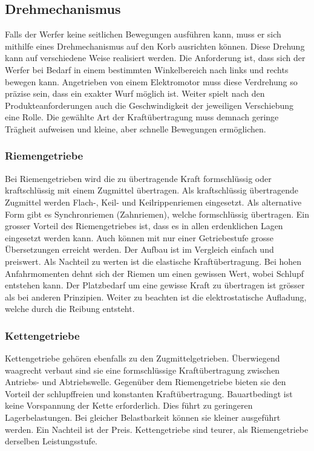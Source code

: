 \subsection{Drehmechanismus}
Falls der Werfer keine seitlichen Bewegungen ausführen kann, muss er sich mithilfe eines Drehmechanismus auf den Korb ausrichten können. Diese Drehung kann auf verschiedene Weise realisiert werden. Die Anforderung ist, dass sich der Werfer bei Bedarf in einem bestimmten Winkelbereich nach links und rechts bewegen kann. Angetrieben von einem Elektromotor muss diese Verdrehung so präzise sein, dass ein exakter Wurf möglich ist. Weiter spielt nach den Produkteanforderungen auch die Geschwindigkeit der jeweiligen Verschiebung eine Rolle. Die gewählte Art der Kraftübertragung muss demnach geringe Trägheit aufweisen und kleine, aber schnelle Bewegungen ermöglichen. 
 
\subsubsection{Riemengetriebe}
Bei Riemengetrieben wird die zu übertragende Kraft formschlüssig oder kraftschlüssig mit einem Zugmittel übertragen. Als kraftschlüssig übertragende Zugmittel werden Flach-, Keil- und Keilrippenriemen eingesetzt. Als alternative Form gibt es Synchronriemen (Zahnriemen), welche formschlüssig übertragen. Ein grosser Vorteil des Riemengetriebes ist, dass es in allen erdenklichen Lagen eingesetzt werden kann. Auch können mit nur einer Getriebestufe grosse Übersetzungen erreicht werden. Der Aufbau ist im Vergleich einfach und preiswert. Als Nachteil zu werten ist die elastische Kraftübertragung. Bei hohen Anfahrmomenten dehnt sich der Riemen um einen gewissen Wert, wobei Schlupf entstehen kann. Der Platzbedarf um eine gewisse Kraft zu übertragen ist grösser als bei anderen Prinzipien. Weiter zu beachten ist die elektrostatische Aufladung, welche durch die Reibung entsteht. 
 
\subsubsection{Kettengetriebe}
Kettengetriebe gehören ebenfalls zu den Zugmittelgetrieben. Überwiegend waagrecht verbaut sind sie eine formschlüssige Kraftübertragung zwischen Antriebs- und Abtriebswelle. Gegenüber dem Riemengetriebe bieten sie den Vorteil der schlupffreien und konstanten Kraftübertragung. Bauartbedingt ist keine Vorspannung der Kette erforderlich. Dies führt zu geringeren Lagerbelastungen. Bei gleicher Belastbarkeit können sie kleiner ausgeführt werden. Ein Nachteil ist der Preis. Kettengetriebe sind teurer, als Riemengetriebe derselben Leistungsstufe.

